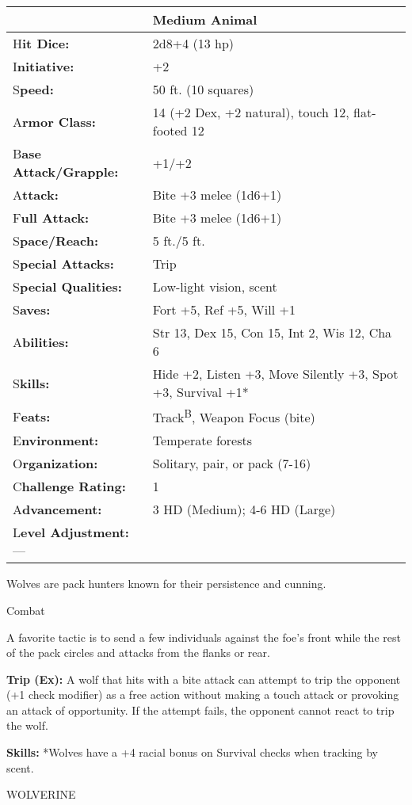 \documentclass{article}
\begin{document}
\begin{tabular}{|>{\raggedright}p{89pt}|>{\raggedright}p{236pt}|}
\hline
  & Medium Animal\tabularnewline
\hline
H\textbf{it Dice:} & 2d8+4 (13 hp)\tabularnewline
\hline
I\textbf{nitiative:} & +2\tabularnewline
\hline
S\textbf{peed:} & 50 ft. (10 squares)\tabularnewline
\hline
A\textbf{rmor Class:} & 14 (+2 Dex, +2 natural), touch 12, flat-footed 12\tabularnewline
\hline
B\textbf{ase Attack/Grapple:} & +1/+2\tabularnewline
\hline
A\textbf{ttack:} & Bite +3 melee (1d6+1)\tabularnewline
\hline
F\textbf{ull Attack:} & Bite +3 melee (1d6+1)\tabularnewline
\hline
S\textbf{pace/Reach:} & 5 ft./5 ft.\tabularnewline
\hline
S\textbf{pecial Attacks:} & Trip\tabularnewline
\hline
S\textbf{pecial Qualities:} & Low-light vision, scent\tabularnewline
\hline
S\textbf{aves:} & Fort +5, Ref +5, Will +1\tabularnewline
\hline
A\textbf{bilities:} & Str 13, Dex 15, Con 15, Int 2, Wis 12, Cha 6\tabularnewline
\hline
S\textbf{kills:} & Hide +2, Listen +3, Move Silently +3, Spot +3, Survival +1*\tabularnewline
\hline
F\textbf{eats:} & Track\textsuperscript{B}, Weapon Focus (bite)\tabularnewline
\hline
E\textbf{nvironment:} & Temperate forests\tabularnewline
\hline
O\textbf{rganization:} & Solitary, pair, or pack (7-16)\tabularnewline
\hline
C\textbf{hallenge Rating:} & 1\tabularnewline
\hline
A\textbf{dvancement:} & 3 HD (Medium); 4-6 HD (Large)\tabularnewline
\hline
L\textbf{evel Adjustment:}--- & \tabularnewline
\hline
\end{tabular}

Wolves are pack hunters known for their persistence and cunning.

Combat

A favorite tactic is to send a few individuals against the foe's front while the 
rest of the pack circles and attacks from the flanks or rear.

\textbf{Trip (Ex): }A wolf that hits with a bite attack can attempt to trip the 
opponent (+1 check modifier) as a free action without making a touch attack or 
provoking an attack of opportunity. If the attempt fails, the opponent cannot react 
to trip the wolf. 

\textbf{Skills:} *Wolves have a +4 racial bonus on Survival checks when tracking 
by scent.

\vspace{12pt}
WOLVERINE
\end{document}
